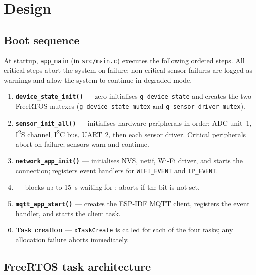 \documentclass[11pt,a4paper]{article}
\begin{document}
\newpage

\section{Design}
\subsection{Boot sequence}
\vspace{5pt}

At startup, \texttt{app\_main} (in \texttt{src/main.c}) executes the following ordered steps.
All critical steps abort the system on failure; non-critical sensor failures are logged as
warnings and allow the system to continue in degraded mode.

\begin{enumerate}[leftmargin=*, label=\textbf{\arabic*.}]
    \item \textbf{\texttt{device\_state\_init()}} --- zero-initialises \texttt{g\_device\_state}
          and creates the two FreeRTOS mutexes (\texttt{g\_device\_state\_mutex} and
          \texttt{g\_sensor\_driver\_mutex}).
    \item \textbf{\texttt{sensor\_init\_all()}} --- initialises hardware peripherals in order:
          ADC unit~1, I\textsuperscript{2}S channel, I\textsuperscript{2}C bus, UART~2, then
          each sensor driver. Critical peripherals abort on failure; sensors warn and continue.
    \item \textbf{\texttt{network\_app\_init()}} --- initialises NVS, netif, Wi-Fi driver, and
          starts the connection; registers event handlers for \texttt{WIFI\_EVENT} and
          \texttt{IP\_EVENT}.
    \item \textbf{\texttt{}} --- blocks up to 15~s
          waiting for \texttt{}; aborts if the bit is not set.
    \item \textbf{\texttt{mqtt\_app\_start()}} --- creates the ESP-IDF MQTT client, registers
          the event handler, and starts the client task.
    \item \textbf{Task creation} --- \texttt{xTaskCreate} is called for each of the four tasks;
          any allocation failure aborts immediately.
\end{enumerate}

\newpage

\subsection{FreeRTOS task architecture}
\end{document}
